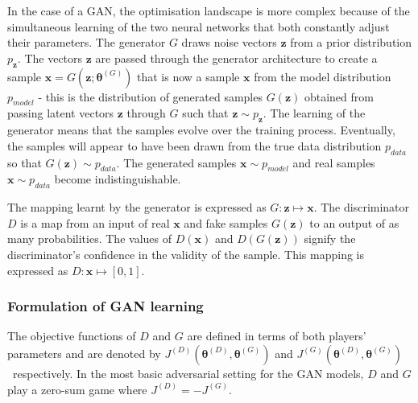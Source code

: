 \documentclass[twocolumn]{article}
\numberwithin{equation}{section}
\begin{document}
In the case of a GAN, the optimisation landscape is more complex because of the simultaneous learning of the two 
neural networks that both constantly adjust their parameters. 
The generator $G$ draws noise vectors $\mathbf{z}$ from a prior 
distribution $p_{\mathbf{z}}$. The vectors $\mathbf{z}$ are passed through the generator architecture to create a 
sample $\mathbf{x}=G(\mathbf{z};\bm{\theta}^{(G)})$ that is now a sample $\mathbf{x}$ from the model distribution 
$p_{model}$ - this is the distribution of generated samples $G(\mathbf{z})$ obtained from passing 
latent vectors $\mathbf{z}$ through $G$ such that $\mathbf{z} \sim p_{\mathbf{z}}$. The learning of the generator 
means that the samples evolve over the training process. Eventually, the samples will appear to have been drawn 
from the true data distribution $p_{data}$ so that $G(\mathbf{z}) \sim p_{data}$. The generated samples 
$\mathbf{x} \sim p_{model}$ and real samples $\mathbf{x} \sim p_{data}$ become indistinguishable. 

The mapping learnt by the generator is expressed as $G \! : \! \mathbf{z} \! \mapsto \! \mathbf{x}$. The 
discriminator $D$ is a map from an input of real $\mathbf{x}$ and fake samples $G(\mathbf{z})$ to an output of 
as many probabilities. The values of  $D(\mathbf{x})$ and $D(G(\mathbf{z}))$ signify the discriminator's confidence 
in the validity of the sample. This mapping is expressed as $D \! : \! \mathbf{x} \!  \mapsto \! [0,1]$. 


\subsubsection{Formulation of GAN learning}
The objective functions of $D$ and $G$ are defined in terms of both players' parameters and are denoted by 
$J^{(D)}(\bm{\theta}^{(D)}, \bm{\theta}^{(G)})$ and $J^{(G)}(\bm{\theta}^{(D)}, \bm{\theta}^{(G)})$~respectively. 
In the most basic adversarial setting for the GAN models, $D$ and $G$ play a zero-sum game where $J^{(D)} = - J^{(G)}$.
\end{document}
